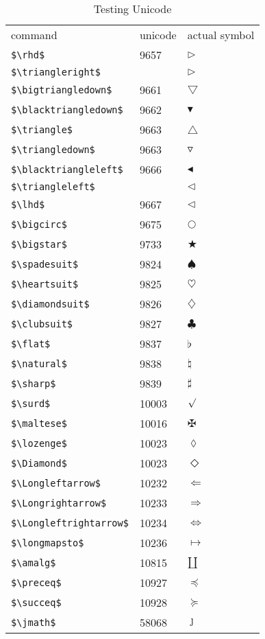 \documentclass{article}
\begin{document}
\begin{table}
\begin{center}
\begin{tabular}{lll}
command & unicode & actual symbol\\
\verb#$\rhd$# & 9657 & $\rhd$\\ 
\verb#$\triangleright$# &  & $\triangleright$\\ 
\verb#$\bigtriangledown$# & 9661 & $\bigtriangledown$\\ 
\verb#$\blacktriangledown$# & 9662 & $\blacktriangledown$\\ 
\verb#$\triangle$# & 9663 & $\triangle$\\ 
\verb#$\triangledown$# & 9663 & $\triangledown$\\ 
\verb#$\blacktriangleleft$# & 9666 & $\blacktriangleleft$\\ 
\verb#$\triangleleft$# &  & $\triangleleft$\\ 
\verb#$\lhd$# & 9667 & $\lhd$\\ 
\verb#$\bigcirc$# & 9675 & $\bigcirc$\\ 
\verb#$\bigstar$# & 9733 & $\bigstar$\\ 
\verb#$\spadesuit$# & 9824 & $\spadesuit$\\ 
\verb#$\heartsuit$# & 9825 & $\heartsuit$\\ 
\verb#$\diamondsuit$# & 9826 & $\diamondsuit$\\ 
\verb#$\clubsuit$# & 9827 & $\clubsuit$\\ 
\verb#$\flat$# & 9837 & $\flat$\\ 
\verb#$\natural$# & 9838 & $\natural$\\ 
\verb#$\sharp$# & 9839 & $\sharp$\\ 
\verb#$\surd$# & 10003 & $\surd$\\ 
\verb#$\maltese$# & 10016 & $\maltese$\\ 
\verb#$\lozenge$# & 10023 & $\lozenge$\\ 
\verb#$\Diamond$# & 10023 & $\Diamond$\\ 
\verb#$\Longleftarrow$# & 10232 & $\Longleftarrow$\\ 
\verb#$\Longrightarrow$# & 10233 & $\Longrightarrow$\\ 
\verb#$\Longleftrightarrow$# & 10234 & $\Longleftrightarrow$\\ 
\verb#$\longmapsto$# & 10236 & $\longmapsto$\\ 
\verb#$\amalg$# & 10815 & $\amalg$\\ 
\verb#$\preceq$# & 10927 & $\preceq$\\ 
\verb#$\succeq$# & 10928 & $\succeq$\\ 
\verb#$\jmath$# & 58068 & $\jmath$\\ 
\end{tabular}
\end{center}
\caption{Testing Unicode}
\end{table}
\end{document}
